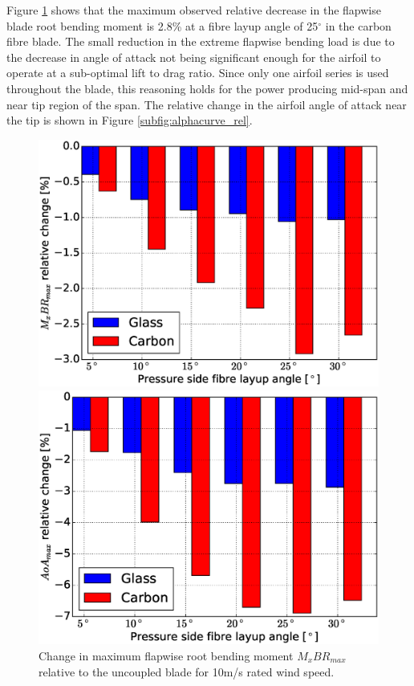 \documentclass[a4paper]{jpconf}
\begin{document}
Figure \ref{subfig:mx_rel} shows that the maximum observed relative decrease in the flapwise blade root bending moment is 2.8\% at a fibre layup angle of 25$^\circ$ in the carbon fibre blade. The small reduction in the extreme flapwise bending load is due to the decrease in angle of attack not being significant enough for the airfoil to operate at a sub-optimal lift to drag ratio. Since only one airfoil series is used throughout the blade, this reasoning holds for the power producing mid-span and near tip region of the span. The relative change in the airfoil angle of attack near the tip is shown in Figure \ref{subfig:alphacurve_rel}.


\begin{figure}[pth]
\centering
\begin{minipage}{0.35\textwidth}
\includegraphics[width=\linewidth]{Figures/Chapter4/Load/steady_relmxbr.eps}
\caption{\label{subfig:mx_rel}Change in maximum flapwise root bending moment $M_xBR_{max}$ relative to the uncoupled blade for 10m/s rated wind speed.}
\end{minipage}\hspace{0.10\textwidth}%
\begin{minipage}{0.35\textwidth}
\includegraphics[width=\linewidth]{Figures/Chapter4/Load/steady_relalpha.eps}

\end{minipage}
\end{figure}
\end{document}
